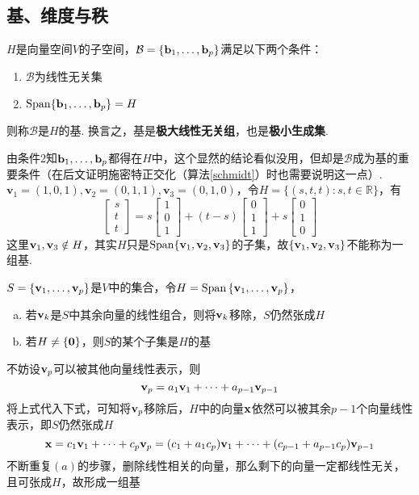 \subsection{基、维度与秩}
\begin{definition}[基]
$H$是向量空间$V$的子空间，$\mathcal{B}=\{\mathbf{b}_1,\dots,\mathbf{b}_p\}$满足以下两个条件：
\begin{enumerate}
	\itemsep -3pt
	\item $\mathcal{B}$为线性无关集
	\item $\mathrm{Span}\{\mathbf{b}_1,\dots,\mathbf{b}_p\}=H$
\end{enumerate}
则称$\mathcal{B}$是$H$的基. 换言之，基是\textbf{极大线性无关组}，也是\textbf{极小生成集}.
\end{definition}
由条件2知$\mathbf{b}_1,\dots,\mathbf{b}_p$都得在$H$中，这个显然的结论看似没用，但却是$\mathcal{B}$成为基的重要条件（在后文证明施密特正交化（算法\ref{schmidt}）时也需要说明这一点）.
$\mathbf{v}_1=(1,0,1),\mathbf{v}_2=(0,1,1),\mathbf{v}_3=(0,1,0)$，令$H=\{(s,t,t):s,t\in \mathbb{R}\}$，有
\[
\begin{bmatrix}s \\t \\t\end{bmatrix}=s\begin{bmatrix}1 \\0 \\1\end{bmatrix}+(t-s)\begin{bmatrix}0 \\1 \\1 \end{bmatrix}+s\begin{bmatrix}0 \\1 \\0 \end{bmatrix}\]
这里$\mathbf{v}_1,\mathbf{v}_3\notin H$，其实$H$只是$\mathrm{Span}\{\mathbf{v}_1,\mathbf{v}_2,\mathbf{v}_3\}$的子集，故$\{\mathbf{v}_1,\mathbf{v}_2,\mathbf{v}_3\}$不能称为一组基.
\begin{theorem}
$S=\{\mathbf{v}_1,\dots,\mathbf{v}_p\}$是$V$中的集合，令$H=\mathrm{Span}\,\{\mathbf{v}_1,\dots,\mathbf{v}_p\}$，
\begin{enumerate}[(a)]
	\itemsep -3pt
	\item 若$\mathbf{v}_k$是$S$中其余向量的线性组合，则将$\mathbf{v}_k$移除，$S$仍然张成$H$
	\item 若$H\ne\{\mathbf{0}\}$，则$S$的某个子集是$H$的基
\end{enumerate}
\end{theorem}
\begin{analysis}不妨设$\mathbf{v}_p$可以被其他向量线性表示，则
\[\mathbf{v}_p=a_1\mathbf{v}_1+\cdots+a_{p-1}\mathbf{v}_{p-1}\]
将上式代入下式，可知将$\mathbf{v}_p$移除后，$H$中的向量$\mathbf{x}$依然可以被其余$p-1$个向量线性表示，即$S$仍然张成$H$
\[\mathbf{x}=c_1\mathbf{v}_1+\cdots+c_p\mathbf{v}_p=(c_1+a_1c_p)\mathbf{v}_1+\cdots+(c_{p-1}+a_{p-1}c_p)\mathbf{v}_{p-1}\]
不断重复$(a)$的步骤，删除线性相关的向量，那么剩下的向量一定都线性无关，且可张成$H$，故形成一组基
\end{analysis}
